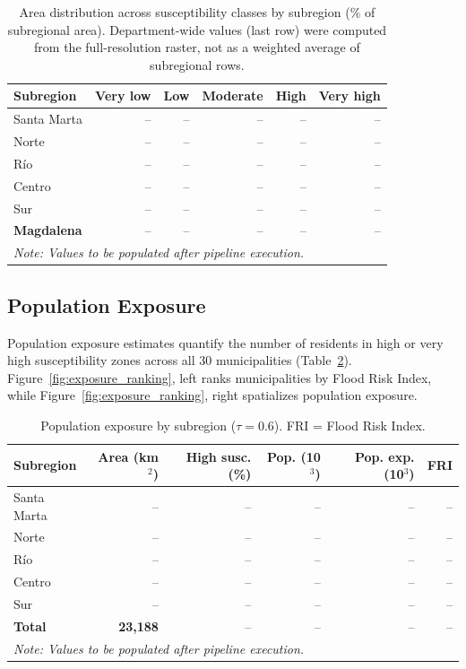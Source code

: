 \documentclass{article}
\begin{document}
\begin{table}[htbp]
\caption{Area distribution across susceptibility classes by subregion (\% of subregional area). Department-wide values (last row) were computed from the full-resolution raster, not as a weighted average of subregional rows.}
\label{tab:suscept_area}
\centering
\footnotesize
\begin{tabular}{lrrrrr}
\toprule
\textbf{Subregion} & \textbf{Very low} & \textbf{Low} & \textbf{Moderate} & \textbf{High} & \textbf{Very high} \\
\midrule
Santa Marta          & -- & -- & -- & -- & -- \\
Norte                & -- & -- & -- & -- & -- \\
R\'io                & -- & -- & -- & -- & -- \\
Centro               & -- & -- & -- & -- & -- \\
Sur                  & -- & -- & -- & -- & -- \\
\midrule
\textbf{Magdalena}   & -- & -- & -- & -- & -- \\
\bottomrule
\multicolumn{6}{l}{\scriptsize \textit{Note: Values to be populated after pipeline execution.}}
\end{tabular}
\end{table}

\subsection{Population Exposure}

Population exposure estimates quantify the number of residents in high or very high susceptibility zones across all 30 municipalities (Table~\ref{tab:exposure}). Figure~\ref{fig:exposure_ranking}, left ranks municipalities by Flood Risk Index, while Figure~\ref{fig:exposure_ranking}, right spatializes population exposure.

\begin{table}[htbp]
\caption{Population exposure by subregion ($\tau = 0.6$). FRI = Flood Risk Index.}
\label{tab:exposure}
\centering
\footnotesize
\begin{tabular}{lrrrrr}
\toprule
\textbf{Subregion} & \textbf{Area (km$^2$)} & \textbf{High susc. (\%)} & \textbf{Pop. (10$^3$)} & \textbf{Pop. exp. (10$^3$)} & \textbf{FRI} \\
\midrule
Santa Marta          & --  & -- & -- & -- & -- \\
Norte                & --  & -- & -- & -- & -- \\
R\'io                & --  & -- & -- & -- & -- \\
Centro               & --  & -- & -- & -- & -- \\
Sur                  & --  & -- & -- & -- & -- \\
\midrule
\textbf{Total}       & \textbf{23,188} & -- & -- & -- & -- \\
\bottomrule
\multicolumn{6}{l}{\scriptsize \textit{Note: Values to be populated after pipeline execution.}}
\end{tabular}
\end{table}
\end{document}
